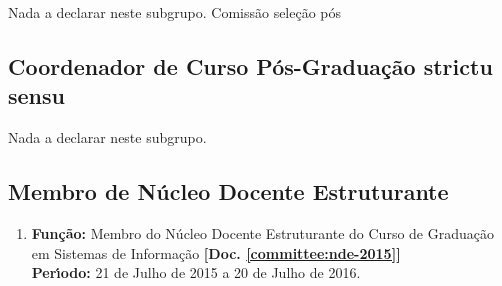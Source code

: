 \documentclass[a4paper,oneside,10pt]{article}
\begin{document}
Nada a declarar neste subgrupo.
%
%
%
Comissão seleção pós


\subsection{Coordenador de Curso Pós-Graduação \textbf{strictu sensu} }
\vspace{0.3cm}

Nada a declarar neste subgrupo.
%
%
%


\subsection{Membro de Núcleo Docente Estruturante}
\vspace{0.3cm}

\begin{enumerate}
\renewcommand{\labelenumi}{{\large\bfseries\arabic{enumi}.}}

\item   \textbf{Fun\c{c}\~{a}o:} Membro do Núcleo Docente Estruturante do Curso de Graduação em Sistemas de Informação \textbf{[Doc. \ref{committee:nde-2015}]}\\
        \textbf{Per\'{\i}odo:} 21 de Julho de 2015 a 20 de Julho de 2016.


\end{enumerate}
\end{document}
